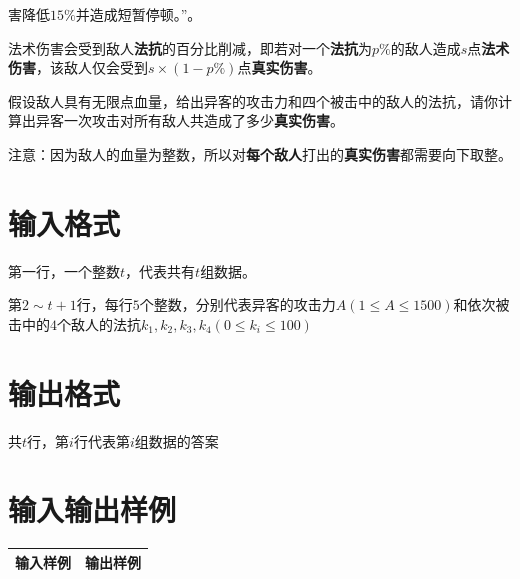 \documentclass[
	lang=cn,
	color=green
]{elegantbook}
\begin{document}
害降低$15\%$并造成短暂停顿。”。

法术伤害会受到敌人\textbf{法抗}的百分比削减，即若对一个\textbf{法抗}为$p\%$的敌人造成$s$点\textbf{法术伤害}，该敌人仅会受到$s \times (1-p\%)$点\textbf{真实伤害}。

假设敌人具有无限点血量，给出异客的攻击力和四个被击中的敌人的法抗，请你计算出异客一次攻击对所有敌人共造成了多少\textbf{真实伤害}。

注意：因为敌人的血量为整数，所以对\textbf{每个敌人}打出的\textbf{真实伤害}都需要向下取整。

\section*{输入格式}
第一行，一个整数$t$，代表共有$t$组数据。

第$2 \sim t+1$行，每行$5$个整数，分别代表异客的攻击力$A(1 \leq A \leq 1500)$和依次被击中的$4$个敌人的法抗$k_1,k_2,k_3,k_4(0 \leq k_i \leq 100)$

\section*{输出格式}
共$t$行，第$i$行代表第$i$组数据的答案

\section*{输入输出样例}
\begin{tabularx}{450pt}{X|X}
    \toprule
    输入样例 & 输出样例 \\
    \midrule

    \bottomrule
\end{tabularx}
\end{document}
